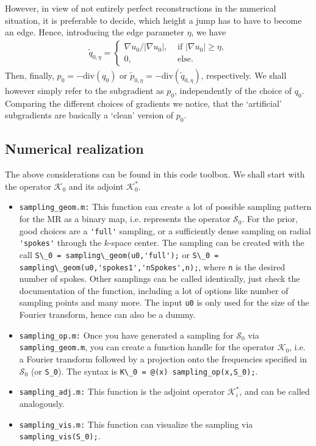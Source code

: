 \documentclass{article}
\newcommand{\mat}[1]{\lstinline[style=Matlab-editor]{#1}}
\newcommand{\diverg}{\mathrm{div}}
\newcommand{\Kcal}{\mathcal{K}}
\newcommand{\Scal}{\mathcal{S}}
\newcommand{\qt}{\tilde{q}}
\begin{document}
However, in view of not entirely perfect reconstructions in the numerical situation, it is preferable to decide, which height a jump has to have to become an edge.
Hence, introducing the edge parameter $\eta$, we have 
\begin{align*}
 \qt_{0,\eta} = \begin{cases}
        \nabla u_0 / |\nabla u_0|, &\text{ if } |\nabla u_0| \geq \eta, \\
        0, &\text{ else. }
       \end{cases}
\end{align*}
Then, finally, $p_0 = -\diverg(q_0)$ or $\tilde{p}_{0,\eta} = -\diverg (\qt_{0,\eta})$, respectively. 
We shall however simply refer to the subgradient as $p_0$, independently of the choice of $q_0$.
Comparing the different choices of gradients we notice, that the `artificial' subgradients are basically a `clean' version of $p_0$.

\subsection{Numerical realization}
The above considerations can be found in this code toolbox. 
We shall start with the operator $\Kcal_0$ and its adjoint $\Kcal_0^*$.

\begin{itemize}
 \item \mat{sampling_geom.m:} This function can create a lot of possible sampling pattern for the MR as a binary map, i.e. represents the operator $\Scal_0$. 
 For the prior, good choices are a \mat{'full'} sampling, or a sufficiently dense sampling on radial \mat{'spokes'} through the $k$-space center. 
 The sampling can be created with the call \mat{S\_0 = sampling\_geom(u0,'full');} or \mat{S\_0 = sampling\_geom(u0,'spokes1','nSpokes',n);}, where \mat{n} is the desired number of spokes. 
 Other samplings can be called identically, just check the documentation of the function, including a lot of options like number of sampling points and many more. 
 The input \mat{u0} is only used for the size of the Fourier transform, hence can also be a dummy.
 
 \item \mat{sampling_op.m:} Once you have generated a sampling for $\Scal_0$ via \mat{sampling_geom.m}, you can create a function handle for the operator $\Kcal_0$, i.e.  a Fourier transform followed by a projection onto the frequencies specified in $\Scal_0$ (or \mat{S_0}). 
 The syntax is \mat{K\_0 = @(x) sampling_op(x,S_0);}.
 
 \item \mat{sampling_adj.m:} This function is the adjoint operator $\Kcal_i^*$, and can be called analogously.
 
 \item \mat{sampling_vis.m:} This function can visualize the sampling via \mat{sampling_vis(S_0);}.
\end{itemize}
\end{document}
